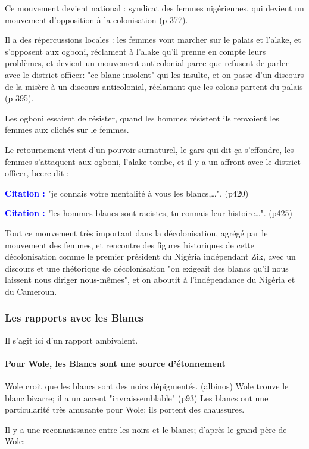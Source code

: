 \documentclass[a4paper, 11pt, hidelinks]{article}
\newcommand{\bs}{\bigskip}
\newcommand{\cit}{\large \textcolor{blue}{\textbf{Citation :}} \large }
\begin{document}
Ce mouvement devient national : syndicat des femmes nigériennes, qui devient un mouvement d'opposition à 
la colonisation (p 377). 
\bs


Il a des répercussions locales : les femmes vont marcher sur le palais et l'alake, et s'opposent aux 
ogboni, réclament à l'alake qu'il prenne en compte leurs problèmes, et devient un mouvement anticolonial 
parce que refusent de parler avec le district officer: "ce blanc insolent" qui les insulte, et on passe 
d'un discours de la misère à un discours anticolonial, réclamant que les colons partent du palais (p 395).


Les ogboni essaient de résister, quand les hommes résistent ils renvoient les femmes aux clichés sur le 
femmes. 
\bs


Le retournement vient d'un pouvoir surnaturel, le gars qui dit ça s'effondre, les femmes 
s'attaquent aux ogboni, l'alake tombe, et il y a un affront avec le district officer, beere dit :


\cit "je connais votre mentalité à vous les blancs,…", (p420) 


\cit "les hommes blancs sont racistes, tu connais leur histoire…". (p425)
\bs

Tout ce mouvement très important dans la décolonisation, agrégé par le mouvement des 
femmes, et rencontre des figures historiques de cette décolonisation comme le premier président du 
Nigéria indépendant Zik, avec un discours et une rhétorique de décolonisation "on exigeait des blancs 
qu'il nous laissent nous diriger nous-mêmes", et on aboutit à l'indépendance du Nigéria et du Cameroun.


\subsubsection{Les rapports avec les Blancs}

Il s'agit ici d'un rapport ambivalent.

\paragraph{Pour Wole, les Blancs sont une source d'étonnement}


Wole croit que les blancs sont des noirs dépigmentés. (albinos)
Wole trouve le blanc bizarre; il a un accent "invraissemblable" (p93)
Les blancs ont une particularité très amusante pour Wole: ils portent des chaussures.

\bs

Il y a une reconnaissance entre les noirs et le blancs; d'après le grand-père de Wole:
\end{document}
